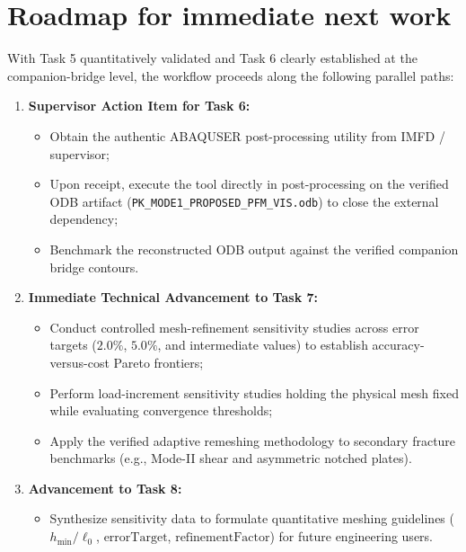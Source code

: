 \section{Roadmap for immediate next work}
With Task 5 quantitatively validated and Task 6 clearly established at the companion-bridge level, the workflow proceeds along the following parallel paths:
\begin{enumerate}
  \item \textbf{Supervisor Action Item for Task 6:}
  \begin{itemize}
    \item Obtain the authentic \textsc{ABAQUSER} post-processing utility from IMFD / supervisor;
    \item Upon receipt, execute the tool directly in post-processing on the verified ODB artifact (\texttt{PK\_MODE1\_PROPOSED\_PFM\_VIS.odb}) to close the external dependency;
    \item Benchmark the reconstructed ODB output against the verified companion bridge contours.
  \end{itemize}
  \item \textbf{Immediate Technical Advancement to Task 7:}
  \begin{itemize}
    \item Conduct controlled mesh-refinement sensitivity studies across error targets ($2.0\%$, $5.0\%$, and intermediate values) to establish accuracy-versus-cost Pareto frontiers;
    \item Perform load-increment sensitivity studies holding the physical mesh fixed while evaluating convergence thresholds;
    \item Apply the verified adaptive remeshing methodology to secondary fracture benchmarks (e.g., Mode-II shear and asymmetric notched plates).
  \end{itemize}
  \item \textbf{Advancement to Task 8:}
  \begin{itemize}
    \item Synthesize sensitivity data to formulate quantitative meshing guidelines ($h_{\min}/\ell_0$, $\text{errorTarget}$, $\text{refinementFactor}$) for future engineering users.
  \end{itemize}
\end{enumerate}
